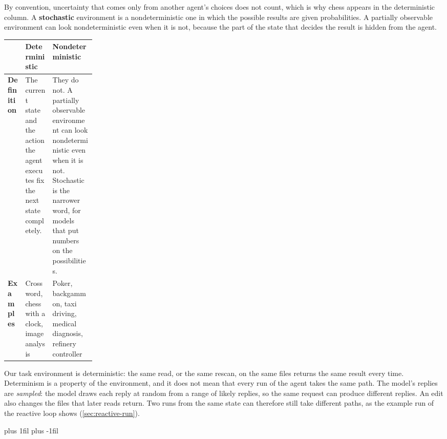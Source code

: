 By convention, uncertainty that comes only from another agent's choices does not count, which is
why chess appears in the deterministic column. A \textbf{stochastic} environment is a
nondeterministic one in which the possible results are given probabilities. A partially observable
environment can look nondeterministic even when it is not, because the part of the state that
decides the result is hidden from the agent.
\par\nopagebreak\smallskip
\noindent\begin{adjustbox}{width=\linewidth}\begin{tabularx}{\linewidth}{L{0.2\linewidth}XX}
  \toprule
  & \textbf{Deterministic} & \textbf{Nondeterministic} \\
  \midrule
  \textbf{Definition} & The current state and the action the agent executes fix the next state
  completely. & They do not. A partially observable environment can look nondeterministic even when
  it is not. Stochastic is the narrower word, for models that put numbers on the possibilities. \\
  \textbf{Examples} & Crossword, chess with a clock, image analysis & Poker, backgammon, taxi
  driving, medical diagnosis, refinery controller \\
  \bottomrule
\end{tabularx}\end{adjustbox}\par
Our task environment is deterministic: the same read, or the same rescan, on the same files returns
the same result every time. Determinism is a property of the environment, and it does not mean that
every run of the agent takes the same path. The model's replies are \emph{sampled}: the model draws
each reply at random from a range of likely replies, so the same request can produce different
replies. An edit also changes the files that later reads return. Two runs from the same state can
therefore still take different paths, as the example run of the reactive loop shows
(\cref{sec:reactive-run}).

\par\vskip 0pt plus 1fil\vskip 0pt plus -1fil\relax
